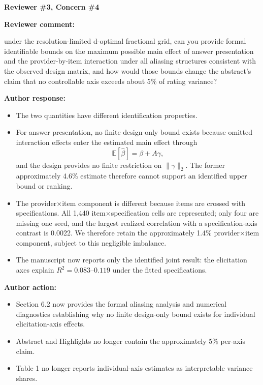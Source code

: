 \documentclass[11pt]{article}
\newcommand{\rvcomment}[1]{{\color{ReviewerGreen}#1}}
\newcommand{\concern}[1]{\textbf{\color{ReviewerGreen}#1}}
\begin{document}
\vspace{4pt}

\concern{Reviewer \#3, Concern \#4}

\concern{Reviewer comment:}

\rvcomment{under the resolution-limited d-optimal fractional grid, can you provide formal
identifiable bounds on the maximum possible main effect of answer presentation and the
provider-by-item interaction under all aliasing structures consistent with the observed design
matrix, and how would those bounds change the abstract's claim that no controllable axis exceeds
about 5\% of rating variance?}

\textbf{Author response:}

\begin{itemize}
\item The two quantities have different identification properties.
\item For answer presentation, no finite design-only bound exists because omitted interaction effects
enter the estimated main effect through
\[
\mathbb{E}[\hat{\beta}] = \beta + A\gamma,
\]
and the design provides no finite restriction on $\lVert\gamma\rVert_2$. The former approximately
4.6\% estimate therefore cannot support an identified upper bound or ranking.
\item The provider$\times$item component is different because items are crossed with specifications.
All 1{,}440 item$\times$specification cells are represented; only four are missing one seed, and
the largest realized correlation with a specification-axis contrast is 0.0022. We therefore retain
the approximately 1.4\% provider$\times$item component, subject to this negligible imbalance.
\item The manuscript now reports only the identified joint result: the elicitation axes explain
$R^2=0.083$--$0.119$ under the fitted specifications.
\end{itemize}

\textbf{Author action:}

\begin{itemize}
\item Section 6.2 now provides the formal aliasing analysis and numerical diagnostics
establishing why no finite design-only bound exists for individual elicitation-axis effects.
\item Abstract and Highlights no longer contain the approximately 5\% per-axis claim.
\item Table 1 no longer reports individual-axis estimates as interpretable variance
shares.
\end{itemize}

\vspace{4pt}
\end{document}
